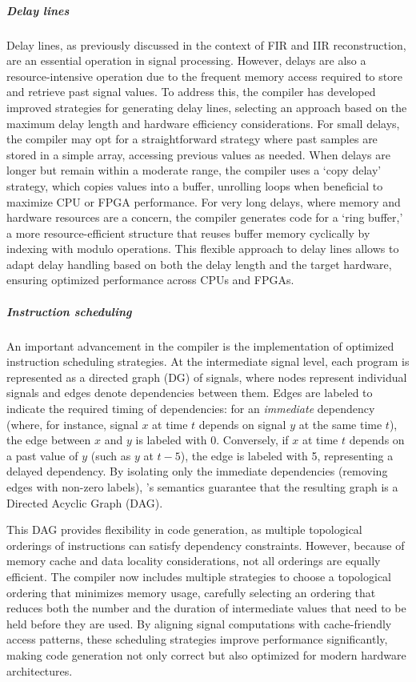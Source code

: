 \subparagraph{Delay lines}

Delay lines, as previously discussed in the context of FIR and IIR
reconstruction, are an essential operation in signal processing.
However, delays are also a resource-intensive operation due to the
frequent memory access required to store and retrieve past signal
values. To address this, the \F{} compiler has developed improved
strategies for generating delay lines, selecting an approach based on
the maximum delay length and hardware efficiency considerations. For
small delays, the compiler may opt for a straightforward strategy where
past samples are stored in a simple array, accessing previous values as
needed. When delays are longer but remain within a moderate range, the
compiler uses a `copy delay' strategy, which copies values into a
buffer, unrolling loops when beneficial to maximize CPU or FPGA
performance. For very long delays, where memory and hardware resources
are a concern, the compiler generates code for a `ring buffer,' a more
resource-efficient structure that reuses buffer memory cyclically by
indexing with modulo operations. This flexible approach to delay lines
allows \F{} to adapt delay handling based on both the delay length and
the target hardware, ensuring optimized performance across CPUs and
FPGAs.

\subparagraph{Instruction scheduling}

An important advancement in the \F{} compiler is the implementation of
optimized instruction scheduling strategies. At the intermediate signal
level, each \F{} program is represented as a directed graph (DG) of
signals, where nodes represent individual signals and edges denote
dependencies between them. Edges are labeled to indicate the required
timing of dependencies: for an \emph{immediate} dependency (where, for
instance, signal \(x\) at time \(t\) depends on signal \(y\) at the same
time \(t\)), the edge between \(x\) and \(y\) is labeled with 0.
Conversely, if \(x\) at time \(t\) depends on a past value of \(y\)
(such as \(y\) at \(t - 5\)), the edge is labeled with 5, representing a
delayed dependency. By isolating only the immediate dependencies
(removing edges with non-zero labels), \F{}'s semantics guarantee that
the resulting graph is a Directed Acyclic Graph (DAG).

This DAG provides flexibility in code generation, as multiple
topological orderings of instructions can satisfy dependency
constraints. However, because of memory cache and data locality
considerations, not all orderings are equally efficient. The \F{}
compiler now includes multiple strategies to choose a topological
ordering that minimizes memory usage, carefully selecting an ordering
that reduces both the number and the duration of intermediate values
that need to be held before they are used. By aligning signal
computations with cache-friendly access patterns, these scheduling
strategies improve performance significantly, making \F{} code
generation not only correct but also optimized for modern hardware
architectures.

